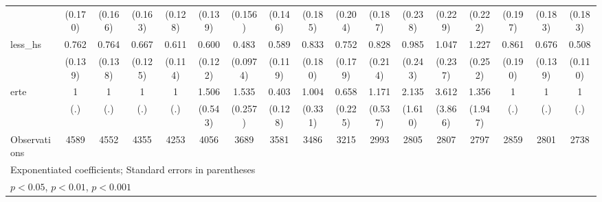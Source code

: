 {\begin{tabular}{l*{16}{c}}
                    &     (0.170)         &     (0.166)         &     (0.163)         &     (0.128)         &     (0.139)         &     (0.156)         &     (0.146)         &     (0.185)         &     (0.204)         &     (0.187)         &     (0.238)         &     (0.229)         &     (0.222)         &     (0.197)         &     (0.183)         &     (0.183)         \\
[1em]
less\_hs             &       0.762         &       0.764         &       0.667\sym{*}  &       0.611\sym{**} &       0.600\sym{*}  &       0.483\sym{***}&       0.589\sym{**} &       0.833         &       0.752         &       0.828         &       0.985         &       1.047         &       1.227         &       0.861         &       0.676         &       0.508\sym{**} \\
                    &     (0.139)         &     (0.138)         &     (0.125)         &     (0.114)         &     (0.122)         &    (0.0974)         &     (0.119)         &     (0.180)         &     (0.179)         &     (0.214)         &     (0.243)         &     (0.237)         &     (0.252)         &     (0.190)         &     (0.139)         &     (0.110)         \\
[1em]
erte                &           1         &           1         &           1         &           1         &       1.506         &       1.535\sym{*}  &       0.403\sym{**} &       1.004         &       0.658         &       1.171         &       2.135         &       3.612         &       1.356         &           1         &           1         &           1         \\
                    &         (.)         &         (.)         &         (.)         &         (.)         &     (0.543)         &     (0.257)         &     (0.128)         &     (0.331)         &     (0.225)         &     (0.537)         &     (1.610)         &     (3.866)         &     (1.947)         &         (.)         &         (.)         &         (.)         \\
\hline
Observations        &        4589         &        4552         &        4355         &        4253         &        4056         &        3689         &        3581         &        3486         &        3215         &        2993         &        2805         &        2807         &        2797         &        2859         &        2801         &        2738         \\
\hline\hline
\multicolumn{17}{l}{\footnotesize Exponentiated coefficients; Standard errors in parentheses}\\
\multicolumn{17}{l}{\footnotesize \sym{*} \(p<0.05\), \sym{**} \(p<0.01\), \sym{***} \(p<0.001\)}\\
\end{tabular}
}
